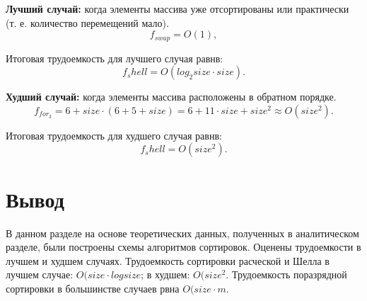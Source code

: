 \textbf{Лучший случай:} когда элементы массива уже отсортированы или практически (т. е. количество перемещений мало).
\begin{equation}
	f_{swap} = O(1), 
\end{equation}

Итоговая трудоемкость для лучшего случая равнв: 
\begin{equation}
	f_shell = O(log_2{size} \cdot size).
\end{equation}

\textbf{Худший случай:} когда элементы массива расположены в обратном порядке.
\begin{equation}
	f_{for_3} = 6 + size \cdot (6 + 5 + size) = 6 + 11 \cdot size + size^2 \approx O(size^2).
\end{equation}

Итоговая трудоемкость для худшего случая равнв: 
\begin{equation}
	f_shell = O(size^2).
\end{equation}

\section*{Вывод}
В данном разделе на основе теоретических данных, полученных в аналитическом разделе, были построены схемы алгоритмов сортировок. 
Оценены трудоемкости в лучшем и худшем случаях. 
Трудоемкость сортировки расческой и Шелла в лучшем случае: $O(size \cdot log{size}$; в худшем: $O(size^2$.
Трудоемкость поразрядной сортировки в большинстве случаев рвна $O(size \cdot m$.









